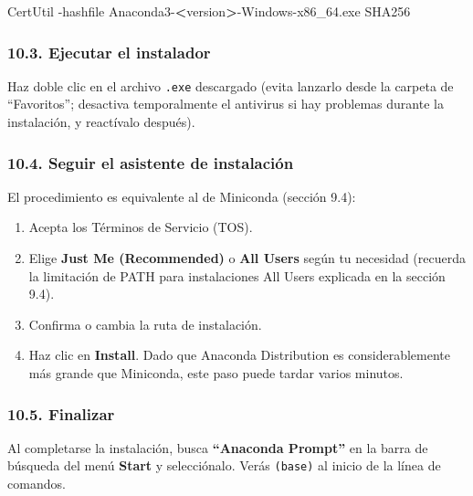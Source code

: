 \documentclass[
  doc,
  floatsintext,
  longtable,
  a4paper,
  nolmodern,
  notxfonts,
  notimes,
  12pt,
  colorlinks=true,linkcolor=blue,citecolor=blue,urlcolor=blue]{apa7}
\newenvironment{Shaded}{\begin{snugshade}}{\end{snugshade}}
\newcommand{\AttributeTok}[1]{\textcolor[rgb]{0.40,0.45,0.13}{#1}}
\newcommand{\KeywordTok}[1]{\textcolor[rgb]{0.00,0.23,0.31}{\textbf{#1}}}
\newcommand{\NormalTok}[1]{\textcolor[rgb]{0.00,0.23,0.31}{#1}}
\providecommand{\tightlist}{%
  \setlength{\itemsep}{0pt}\setlength{\parskip}{0pt}}
\begin{document}
\begin{Shaded}
\begin{Highlighting}[]
\NormalTok{CertUtil }\AttributeTok{{-}hashfile}\NormalTok{ Anaconda3{-}}\KeywordTok{\textless{}}\NormalTok{version}\KeywordTok{\textgreater{}}\NormalTok{{-}Windows{-}x86\_64.exe SHA256}
\end{Highlighting}
\end{Shaded}

\subsubsection{10.3. Ejecutar el
instalador}\label{ejecutar-el-instalador-3}

Haz doble clic en el archivo \texttt{.exe} descargado (evita lanzarlo
desde la carpeta de ``Favoritos''; desactiva temporalmente el antivirus
si hay problemas durante la instalación, y reactívalo después).

\subsubsection{10.4. Seguir el asistente de
instalación}\label{seguir-el-asistente-de-instalaciuxf3n-1}

El procedimiento es equivalente al de Miniconda (sección 9.4):

\begin{enumerate}
\def\labelenumi{\arabic{enumi}.}
\tightlist
\item
  Acepta los Términos de Servicio (TOS).
\item
  Elige \textbf{Just Me (Recommended)} o \textbf{All Users} según tu
  necesidad (recuerda la limitación de PATH para instalaciones All Users
  explicada en la sección 9.4).
\item
  Confirma o cambia la ruta de instalación.
\item
  Haz clic en \textbf{Install}. Dado que Anaconda Distribution es
  considerablemente más grande que Miniconda, este paso puede tardar
  varios minutos.
\end{enumerate}

\subsubsection{10.5. Finalizar}\label{finalizar-1}

Al completarse la instalación, busca \textbf{``Anaconda Prompt''} en la
barra de búsqueda del menú \textbf{Start} y selecciónalo. Verás
\texttt{(base)} al inicio de la línea de comandos.
\end{document}
